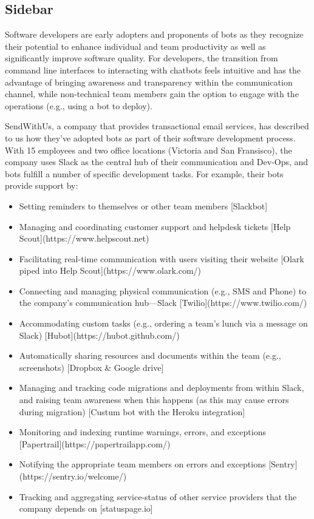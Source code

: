 \documentclass{sig-alternate}
\begin{document}
\begin{mdframed}
\section*{Sidebar}

Software developers are early adopters and proponents of bots as they recognize their potential to enhance individual and team productivity as well as significantly improve software quality. For developers, the transition from command line interfaces to interacting with chatbots feels intuitive and has the advantage of bringing awareness and transparency within the communication channel, while non-technical team members gain the option to engage with the operations (e.g., using a bot to deploy).

SendWithUs, a company that provides transactional email services, has described to us how they've adopted bots as part of their software development process. With 15 employees and two office locations (Victoria and San Fransisco), the company uses Slack as the central hub of their communication and Dev-Ops, and bots fulfill a number of specific development tasks. For example, their bots provide support by:

\begin{itemize} 
\item Setting reminders to themselves or other team members [Slackbot]
\item Managing and coordinating customer support and helpdesk tickets [Help Scout](https://www.helpscout.net)
\item Facilitating real-time communication with users visiting their website [Olark piped into Help Scout](https://www.olark.com/)
\item Connecting and managing physical communication (e.g., SMS and Phone) to the company's communication hub---Slack [Twilio](https://www.twilio.com/)
\item Accommodating custom tasks (e.g., ordering a team's lunch via a message on Slack) [Hubot](https://hubot.github.com/)
\item Automatically sharing resources and documents within the team (e.g., screenshots) [Dropbox \& Google drive]
\item Managing and tracking code migrations and deployments from within Slack, and raising team awareness when this happens (as this may cause errors during migration) [Custum bot with the Heroku integration]
\item Monitoring and indexing runtime warnings, errors, and exceptions [Papertrail](https://papertrailapp.com/)
\item Notifying the appropriate team members on errors and exceptions [Sentry](https://sentry.io/welcome/)
\item Tracking and aggregating service-status of other service providers that the company depends on [statuspage.io]
\end{itemize}


\end{mdframed}
\end{document}
